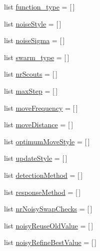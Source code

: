 \begin{CompactItemize}
\item 
list \hyperlink{classpsoParameter_1_1PsoParameter3_2815ac4734571e1e8a58d0e4bbd1f609}{function\_\-type} = \mbox{[}$\,$\mbox{]}
\item 
list \hyperlink{classpsoParameter_1_1PsoParameter3_2d8a666b1194e6b54b4beb544264a2a3}{noiseStyle} = \mbox{[}$\,$\mbox{]}
\item 
list \hyperlink{classpsoParameter_1_1PsoParameter3_38b213182a5510f4e4f78a727c908c4c}{noiseSigma} = \mbox{[}$\,$\mbox{]}
\item 
list \hyperlink{classpsoParameter_1_1PsoParameter3_c1decb2d6e03bf2a68ddc2881b634eed}{swarm\_\-type} = \mbox{[}$\,$\mbox{]}
\item 
list \hyperlink{classpsoParameter_1_1PsoParameter3_2eea6c368dd7d9af6f03b5e73d13bc35}{nrScouts} = \mbox{[}$\,$\mbox{]}
\item 
list \hyperlink{classpsoParameter_1_1PsoParameter3_57f14cf8b17f4b031bab05815b6d42b7}{maxStep} = \mbox{[}$\,$\mbox{]}
\item 
list \hyperlink{classpsoParameter_1_1PsoParameter3_cb5525274ba67cbc8ccb68f8ff45d021}{moveFrequency} = \mbox{[}$\,$\mbox{]}
\item 
list \hyperlink{classpsoParameter_1_1PsoParameter3_9be0a0367d79b122884b3275c8d1e5f7}{moveDistance} = \mbox{[}$\,$\mbox{]}
\item 
list \hyperlink{classpsoParameter_1_1PsoParameter3_dad7126e2dc32930df80b15e924f13aa}{optimumMoveStyle} = \mbox{[}$\,$\mbox{]}
\item 
list \hyperlink{classpsoParameter_1_1PsoParameter3_e8de47448fd56676f2acb1e148799919}{updateStyle} = \mbox{[}$\,$\mbox{]}
\item 
list \hyperlink{classpsoParameter_1_1PsoParameter3_2af4966c5caa6d5cbc20c2ba7acc2bac}{detectionMethod} = \mbox{[}$\,$\mbox{]}
\item 
list \hyperlink{classpsoParameter_1_1PsoParameter3_4dab28d7cc94d9551f36cdee7e618280}{responseMethod} = \mbox{[}$\,$\mbox{]}
\item 
list \hyperlink{classpsoParameter_1_1PsoParameter3_a61412240af8fba41a08150f7d20d432}{nrNoisySwapChecks} = \mbox{[}$\,$\mbox{]}
\item 
list \hyperlink{classpsoParameter_1_1PsoParameter3_8b31af91c15ab92df41248c213961bc3}{noisyReuseOldValue} = \mbox{[}$\,$\mbox{]}
\item 
list \hyperlink{classpsoParameter_1_1PsoParameter3_9d9805dcffbffaaa4526925a9cfc66be}{noisyRefineBestValue} = \mbox{[}$\,$\mbox{]}
\item 

\end{CompactItemize}
